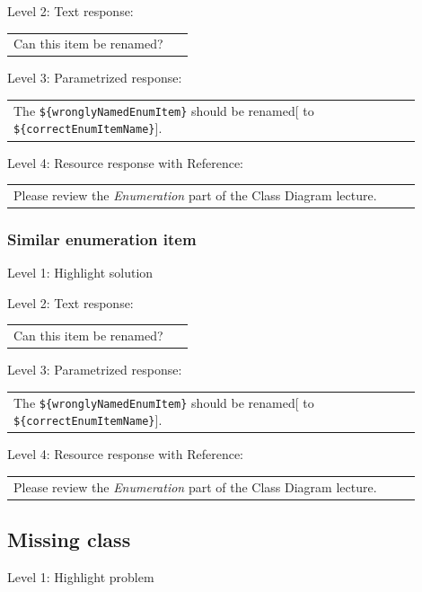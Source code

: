 \noindent Level 2: Text response: \medskip

\begin{tabular}{|p{0.9\linewidth}}
Can this item be renamed?
\end{tabular} \medskip

\noindent Level 3: Parametrized response: \medskip

\begin{tabular}{|p{0.9\linewidth}}
The \verb|${wronglyNamedEnumItem}| should be renamed[ to \verb|${correctEnumItemName}|].
\end{tabular} \medskip

\noindent Level 4: Resource response with Reference: \medskip

\begin{tabular}{|p{0.9\linewidth}}
Please review the \textit{Enumeration} part of the Class Diagram lecture.
\end{tabular} \medskip


\subsubsection{Similar enumeration item}

\noindent Level 1: Highlight solution \medskip

\noindent Level 2: Text response: \medskip

\begin{tabular}{|p{0.9\linewidth}}
Can this item be renamed?
\end{tabular} \medskip

\noindent Level 3: Parametrized response: \medskip

\begin{tabular}{|p{0.9\linewidth}}
The \verb|${wronglyNamedEnumItem}| should be renamed[ to \verb|${correctEnumItemName}|].
\end{tabular} \medskip

\noindent Level 4: Resource response with Reference: \medskip

\begin{tabular}{|p{0.9\linewidth}}
Please review the \textit{Enumeration} part of the Class Diagram lecture.
\end{tabular} \medskip


\subsection{Missing class}

\noindent Level 1: Highlight problem \medskip

